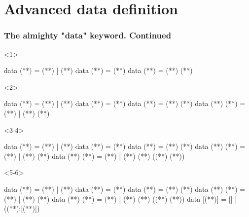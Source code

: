 \documentclass[17pt]{beamer}
\renewcommand{\(}[1]{\begin{columns}[#1]}
\renewcommand{\)}{\end{columns}}
\newcommand{\<}[1]{\begin{column}{#1}}
\renewcommand{\>}{\end{column}}
\begin{document}
\section{Advanced data definition}

\begin{frame}[fragile]
  \frametitle{The almighty "data" keyword. Continued}
  \begin{minipage}[t][.4\textheight]{\textwidth}
    \begin{onlyenv}<1>
      \begin{code}
data (**)    = (**) | (**)
data (**)    = (**)
data (**) = (**) (**)
      \end{code}
    \end{onlyenv}
    \begin{onlyenv}<2>
      \begin{code}
data (**)    = (**) | (**)
data (**)    = (**)
data (**) = (**) (**)
data (**) (**) = (**) | (**) (**)
      \end{code}
    \end{onlyenv}
    \begin{onlyenv}<3-4>
      \begin{code}
data (**)    = (**) | (**)
data (**)    = (**)
data (**) = (**) (**)
data (**) (**) = (**) | (**) (**)
data (**) (**)  = (**) | (**) (**) ((**) (**))
      \end{code}
    \end{onlyenv}
    \begin{onlyenv}<5-6>
      \begin{code}
data (**)    = (**) | (**)
data (**)    = (**)
data (**) = (**) (**)
data (**) (**) = (**) | (**) (**)
data (**) (**)  = (**) | (**) (**) ((**) (**))
data [(**)]     = [] | ((**):[(**)])
      \end{code}
    \end{onlyenv}
  \end{minipage}

\end{frame}
\end{document}
